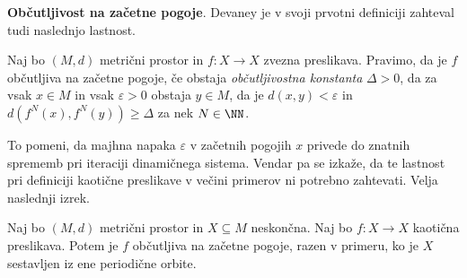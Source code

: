 \vspace{1cm}

\noindent \textbf{Občutljivost na začetne pogoje}.
Devaney je v svoji prvotni definiciji zahteval tudi naslednjo lastnost.

\begin{definicija}
    Naj bo \((M, d)\) metrični prostor in \(f \colon X \to X\) zvezna preslikava. Pravimo, da je \(f\) občutljiva na začetne pogoje, če obstaja \emph{občutljivostna konstanta} \(\Delta > 0\), da za vsak \(x \in M\) in vsak \(\varepsilon > 0\) obstaja \(y \in M\), da je \(d (x, y) < \varepsilon\) in \(d (f^N (x), f^N (y)) \geq \Delta\) za nek \(N \in \NN\).
\end{definicija}

\noindent To pomeni, da majhna napaka \(\varepsilon\) v začetnih pogojih \(x\) privede do znatnih sprememb pri iteraciji dinamičnega sistema. Vendar pa se izkaže, da te lastnost pri definiciji kaotične preslikave v večini primerov ni potrebno zahtevati. Velja naslednji izrek.

\begin{izrek}
    Naj bo \((M, d)\) metrični prostor in \(X \subseteq M\) neskončna. Naj bo \(f \colon X \to X\) kaotična preslikava. Potem je \(f\) občutljiva na začetne pogoje, razen v primeru, ko je \(X\) sestavljen iz ene periodične orbite.
\end{izrek}

